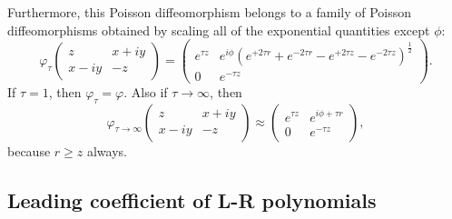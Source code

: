 \documentclass[notitlepage]{article}
\begin{document}
Furthermore, this Poisson diffeomorphism belongs to a family of Poisson diffeomorphisms obtained by scaling all of the exponential quantities except $\phi$:
\begin{equation}
    \varphi_{\tau}
    \begin{pmatrix}
        z & x + i y \\
        x - i y & - z
    \end{pmatrix}
    =
    \begin{pmatrix}
        e^{\tau z} & e^{i \phi} (e^{+2 \tau r} + e^{-2 \tau r} - e^{+2 \tau z} - e^{-2 \tau z})^{\frac{1}{2}} \\
        0 & e^{-\tau z} 
    \end{pmatrix}.
\end{equation}
If $\tau = 1$, then $\varphi_{\tau} = \varphi$. Also if $\tau \to \infty$, then
\begin{equation}
    \varphi_{\tau \to \infty}
    \begin{pmatrix}
        z & x + i y \\
        x - i y & - z
    \end{pmatrix}
    \approx
    \begin{pmatrix}
        e^{\tau z} & e^{i \phi + \tau r} \\
        0 & e^{-\tau z} 
    \end{pmatrix},
\end{equation}
because $r \geq z$ always.

\subsection{Leading coefficient of L-R polynomials}
\end{document}

